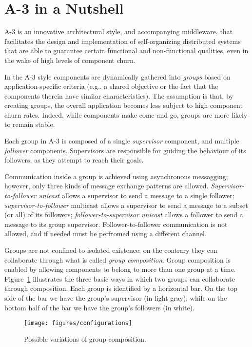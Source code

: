 \section{A-3 in a Nutshell}
\label{sec:a3}

A-3 is an innovative architectural style, and accompanying middleware, that facilitates the design and implementation of self-organizing distributed systems that are able to guarantee certain functional and non-functional qualities, even in the wake of high levels of component churn.  

In the A-3 style components are dynamically gathered into \emph{groups} based on application-specific criteria (e.g., a shared objective or the fact that the components therein have similar characteristics). The assumption is that, by creating groups, the overall application becomes less subject to high component churn rates. Indeed, while components make come and go, groups are more likely to remain stable. 

Each group in A-3 is composed of a single \emph{supervisor} component, and multiple \emph{follower} components. Supervisors are responsible for guiding the behaviour of its followers, as they attempt to reach their goals. 

Communication inside a group is achieved using asynchronous messagging; however, only three kinds of message exchange patterns are allowed. \emph{Supervisor-to-follower unicast} allows a supervisor to send a message to a single follower; \emph{supervisor-to-follower} multicast allows a supervisor to send a message to a subset (or all) of its followers; \emph{follower-to-supervisor unicast} allows a follower to send a message to its group supervisor. Follower-to-follower communication is not allowed, and if needed must be perfromed using a different channel. 

Groups are not confined to isolated existence; on the contrary they can collaborate through what is called \emph{group composition}. Group composition is enabled by allowing components to belong to more than one group at a time. Figure~\ref{fig:configurations} illustrates the three basic ways in which two groups can collaborate through composition. Each group is identified by a horizontal bar. On the top side of the bar we have the group's supervisor (in light gray); while on the bottom half of the bar we have the group's followers (in white).

\begin{figure}[ht]
\centering
\texttt{[image: figures/configurations]}
\caption{Possible variations of group composition.}
\label{fig:configurations}
\end{figure}

